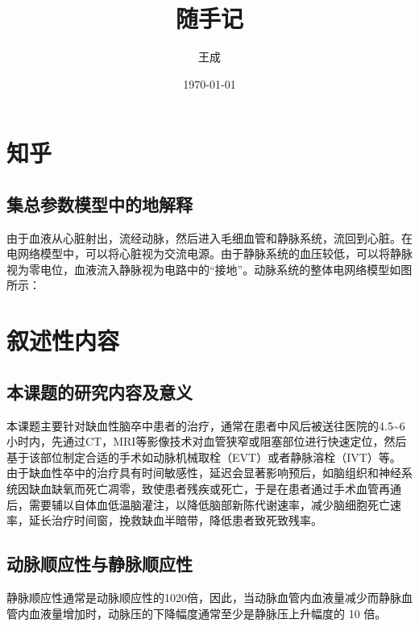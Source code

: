 \documentclass[12pt,a4paper]{article} %
\title{随手记} %
\author{王成} %
\date{\today} %
\begin{document}
\maketitle %

\section{知乎}
\subsection{集总参数模型中的地解释}
\colorbox{yellow!20}{
    \parbox{\dimexpr\linewidth-2\fboxsep}{
        由于血液从心脏射出，流经动脉，然后进入毛细血管和静脉系统，流回到心脏。在电网络模型中，可以将心脏视为交流电源。由于静脉系统的血压较低，可以将静脉视为零电位，血液流入静脉视为电路中的“接地”。动脉系统的整体电网络模型如图所示：
    }
}

\section{叙述性内容}
\subsection{本课题的研究内容及意义}
本课题主要针对缺血性脑卒中患者的治疗，通常在患者中风后被送往医院的4.5\textasciitilde6小时内，先通过CT，MRI等影像技术对血管狭窄或阻塞部位进行快速定位，然后基于该部位制定合适的手术如动脉机械取栓（EVT）或者静脉溶栓（IVT）等。
由于缺血性卒中的治疗具有时间敏感性，延迟会显著影响预后，如脑组织和神经系统因缺血缺氧而死亡凋零，致使患者残疾或死亡，于是在患者通过手术血管再通后，需要辅以自体血低温脑灌注，以降低脑部新陈代谢速率，减少脑细胞死亡速率，延长治疗时间窗，挽救缺血半暗带，降低患者致死致残率。

\subsection{动脉顺应性与静脉顺应性}
    静脉顺应性通常是动脉顺应性的10\textendash 20倍，因此，当动脉血管内血液量减少而静脉血管内血液量增加时，动脉压的下降幅度通常至少是静脉压上升幅度的 10 倍。
\end{document}
